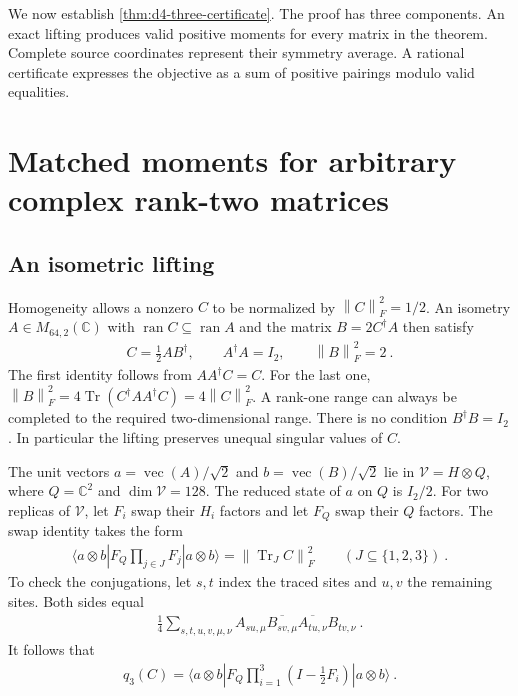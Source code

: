 \documentclass[aps,pra,reprint,superscriptaddress,amsmath,amssymb,floatfix,nofootinbib]{revtex4-2}
\newcommand{\Tr}{\operatorname{Tr}}
\newcommand{\ran}{\operatorname{ran}}
\newcommand{\vecop}{\operatorname{vec}}
\newcommand{\norm}[1]{\left\lVert#1\right\rVert}
\newcommand{\C}{\mathbb C}
\begin{document}
We now establish \cref{thm:d4-three-certificate}.
The proof has three components. An exact lifting produces valid positive
moments for every matrix in the theorem. Complete source coordinates
represent their symmetry average. A rational certificate expresses the
objective as a sum of positive pairings modulo valid equalities.

\section{Matched moments for arbitrary complex rank-two matrices}
\label{sec:matched-four}

\subsection{An isometric lifting}

Homogeneity allows a nonzero $C$ to be normalized by
$\norm C_F^2=1/2$.
An isometry $A\in M_{64,2}(\C)$ with $\ran C\subseteq\ran A$
and the matrix $B=2C^\dagger A$ then satisfy
\begin{align}
 C=\frac12AB^\dagger,
 \qquad A^\dagger A=I_2,
 \qquad \norm B_F^2=2\ .
 \label{eq:isometric-lift}
\end{align}
The first identity follows from $AA^\dagger C=C$.
For the last one,
$\norm B_F^2=4\Tr(C^\dagger AA^\dagger C)=4\norm C_F^2$.
A rank-one range can always be completed to the required two-dimensional
range. There is no condition $B^\dagger B=I_2$.
In particular the lifting preserves unequal singular values of $C$.

The unit vectors
$a=\vecop(A)/\sqrt2$ and $b=\vecop(B)/\sqrt2$ lie in
$\mathcal V=H\otimes Q$, where $Q=\C^2$ and $\dim\mathcal V=128$.
The reduced state of $a$ on $Q$ is $I_2/2$.
For two replicas of $\mathcal V$, let $F_i$ swap their $H_i$ factors
and let $F_Q$ swap their $Q$ factors.
The swap identity takes the form
\begin{align}
 \langle a\otimes b|F_Q\prod_{j\in J}F_j|a\otimes b\rangle
 =\norm{\Tr_JC}_F^2
 \qquad(J\subseteq\{1,2,3\})\ .
 \label{eq:matched-swap-subsets}
\end{align}
To check the conjugations, let $s,t$ index the traced sites and $u,v$
the remaining sites. Both sides equal
\begin{align}
 \frac14\sum_{s,t,u,v,\mu,\nu}
 A_{su,\mu}\overline{B_{sv,\mu}}
 \overline{A_{tu,\nu}}B_{tv,\nu}\ .
 \label{eq:swap-indices}
\end{align}
It follows that
\begin{align}
 q_3(C)=\langle a\otimes b|
     F_Q\prod_{i=1}^3\left(I-\frac12F_i\right)|a\otimes b\rangle\ .
 \label{eq:matched-objective}
\end{align}
\end{document}
